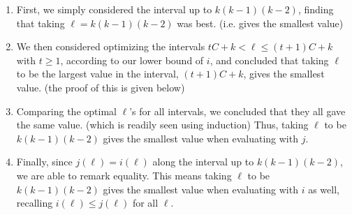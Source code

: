\documentclass{article}
\newcommand{\hide}[1]{}
\newcommand{\edit}[1]{}%
\newcommand{\dc}[1]{}%
\begin{document}
\begin{enumerate}
    \item\label{claim 1} First, we simply considered the interval up to $k(k-1)(k-2)$, finding that taking $\ell = k(k-1)(k-2)$ was best. (i.e. gives the smallest value\dc{ of what?})

\item\label{claim 2}  We then considered optimizing the intervals $tC+k < \ell \leq (t+1)C+k$ with $t \geq 1$, according to our lower bound of $i$, and concluded that taking $\ell$ to be the largest value in the interval, $(t+1)C+k$, gives the smallest value\dc{ of what?}. (the proof of this is given below)\dc{ don't parenthesize this sentence}

\item Comparing the optimal $\ell$'s for all intervals, we concluded that they all gave the same value\dc{ of what?}. (which is readily seen using induction)\edit{ handling parentheticals}  Thus, taking $\ell$ to be $k(k-1)(k-2)$ gives the smallest value when evaluating with $j$.

\item Finally, since $j(\ell)=i(\ell)$ along the interval up to $k(k-1)(k-2)$, we are able to remark equality. This means taking $\ell$ to be $k(k-1)(k-2)$ gives the smallest value when evaluating with $i$ as well, recalling $i(\ell) \le j(\ell)$ for all $\ell$.\edit{ phrasing could be better}
\end{enumerate}
\hide{
 First, we simply considered the interval up to $k(k-1)(k-2)$, finding that taking $\ell = k(k-1)(k-2)$ was best. (i.e. gives the smallest value)

We then considered optimizing the intervals $tC+k < \ell \leq (t+1)C+k$ with $t \geq 1$, according to our lower bound of $i$, and concluded that taking $\ell$ to be the largest value in the interval, $(t+1)C+k$, gives the smallest value. (*) 

Comparing the optimal $\ell$'s for all intervals, we concluded that they all gave the same value. (which is readily seen using induction)\edit{ handling parentheticals; clarifying that they are equal when evalutating according to the lower bound}  Thus, taking $\ell$ to be $k(k-1)(k-2)$ gives the smallest value when evaluating with $j$.

Finally, since $j(\ell)=i(\ell)$ along the interval up to $k(k-1)(k-2)$, we are able to remark equality. This means taking $\ell$ to be $k(k-1)(k-2)$ gives the smallest value when evaluating with $i$ as well.}
\end{document}
